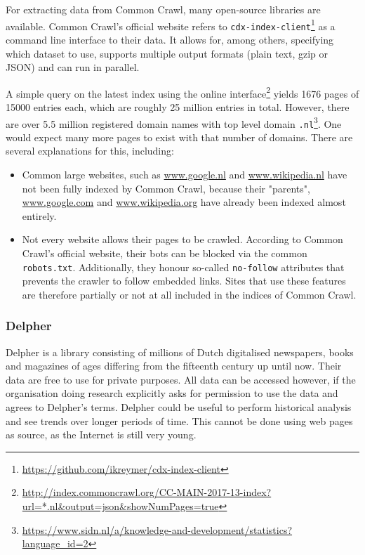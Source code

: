For extracting data from Common Crawl, many open-source libraries are available. Common Crawl's official website refers to \texttt{cdx-index-client}\footnote{\url{https://github.com/ikreymer/cdx-index-client}} as a command line interface to their data. It allows for, among others, specifying which dataset to use, supports multiple output formats (plain text, gzip or JSON) and can run in parallel.

A simple query on the latest index using the online interface\footnote{\url{http://index.commoncrawl.org/CC-MAIN-2017-13-index?url=*.nl&output=json&showNumPages=true}} yields 1676 pages of 15000 entries each, which are roughly 25 million entries in total. However, there are over 5.5 million registered domain names with top level domain \texttt{.nl}\footnote{\url{https://www.sidn.nl/a/knowledge-and-development/statistics?language_id=2}}. One would expect many more pages to exist with that number of domains. There are several explanations for this, including:
\begin{itemize}
\item Common large websites, such as \url{www.google.nl} and \url{www.wikipedia.nl} have not been fully indexed by Common Crawl, because their "parents", \url{www.google.com} and \url{www.wikipedia.org} have already been indexed almost entirely.
\item Not every website allows their pages to be crawled. According to Common Crawl's official website, their bots can be blocked via the common \texttt{robots.txt}. Additionally, they honour so-called \texttt{no-follow} attributes that prevents the crawler to follow embedded links. Sites that use these features are therefore partially or not at all included in the indices of Common Crawl.
\end{itemize}

\subsubsection{Delpher}
Delpher\cite{delpher} is a library consisting of millions of Dutch digitalised newspapers, books and magazines of ages differing from the fifteenth century up until now. Their data are free to use for private purposes. All data can be accessed however, if the organisation doing research explicitly asks for permission to use the data and agrees to Delpher's terms. Delpher could be useful to perform historical analysis and see trends over longer periods of time. This cannot be done using web pages as source, as the Internet is still very young.

